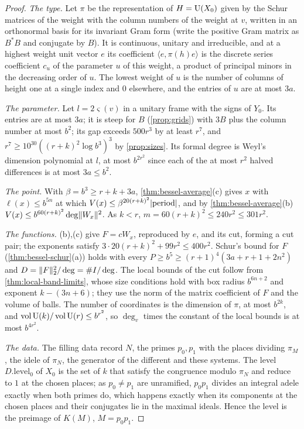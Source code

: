 \begin{proof}
\emph{The type.} Let $\pi$ be the representation of $H=\operatorname{U}(X_0)$ given by the Schur matrices of the weight with the column numbers of the weight at $v$, written in an orthonormal basis for its invariant Gram form (write the positive
Gram matrix as $B^*B$ and conjugate by $B$). It is continuous, unitary and irreducible, and at a highest weight unit vector $e$ its coefficient $\langle e,\pi(h)e\rangle$ is the discrete series coefficient $c_u$ of the
parameter $u$ of this weight, a product of principal minors in the decreasing order of $u$. The lowest weight of $u$ is the number of columns of height one at a single index and $0$ elsewhere, and the entries of $u$ are at most $3a$.

\emph{The parameter.} Let $l=2\varsigma(v)$ in a unitary frame with the signs of $Y_0$. Its entries are at most $3a$; it is steep for $B$ (\cref{prop:grids}) with $3B$ plus the column number at most $b^2$; its gap exceeds $500r^3$ by at least
$r^7$, and $r^7\ge10^{30}((r+k)^2\log b^3)^3$ by \cref{prop:sizes}. Its formal degree is Weyl's dimension polynomial at $l$, at most $b^{2r^2}$ since each of the at most $r^2$ halved differences is at most $3a\le b^2$.

\emph{The point.} With $\beta=b^3\ge r+k+3a$, \cref{thm:bessel-average}(c) gives $x$ with $\ell(x)\le b^{5n}$ at which $V(x)\le\beta^{20(r+k)^2}\lvert \text{period}\rvert$, and by \cref{thm:bessel-average}(b) $V(x)\le b^{60(r+k)^2}\deg\lVert W_x\rVert^2$. As $k<r$,
$m=60(r+k)^2\le240r^2\le301r^2$.

\emph{The functions.} (b),(c) give $F=cW_x$, reproduced by $e$, and its cut, forming a cut pair; the exponents satisfy $3\cdot20(r+k)^2+99r^2\le400r^2$. Schur's bound for $F$ (\cref{thm:bessel-schur}(a)) holds with every
$P\ge b^5\ge(r+1)^4(3a+r+1+2n^2)$ and $D=\lVert F\rVert_2^2/\deg=\#I/\deg$. The local bounds of the cut follow from \cref{thm:local-band-limits}, whose size conditions hold with box radius $b^{6n+2}$ and exponent $k-(3n+6)$; they use the norm of the
matrix coefficient of $F$ and the volume of balls. The number of coordinates is the dimension of $\pi$, at most $b^{2k}$, and $\operatorname{vol}\operatorname{U}(k)/\operatorname{vol}\operatorname{U}(r)\le b^{r^2}$, so $\deg_v$ times the constant of the local bounds is at most $b^{4r^2}$.

\emph{The data.} The filling data record $N$, the primes $p_0,p_1$ with the places dividing $\pi_M$, the idele of $\pi_N$, the generator of the different and these systems. The level $D.\mathrm{level}_0$ of $X_0$ is the set of $k$ that satisfy the
congruence modulo $\pi_N$ and reduce to $1$ at the chosen places; as $p_0\ne p_1$ are unramified, $p_0p_1$ divides an integral adele exactly when both primes do, which happens exactly when its components at the chosen places and their
conjugates lie in the maximal ideals. Hence the level is the preimage of $K(M)$, $M=p_0p_1$.
\end{proof}
